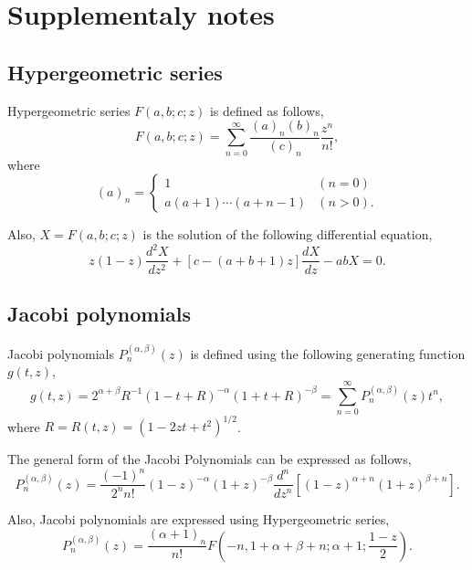 \documentclass[12pt]{article}
\newcommand{\bibun}[2]{\frac{d {#1}}{d {#2}}}
\begin{document}
\section{Supplementaly notes}
\subsection{Hypergeometric series}
Hypergeometric series $F(a,b;c;z)$ is defined as follows,
\begin{equation}
 F(a,b;c;z) = \sum_{n=0}^{\infty} \frac{(a)_n (b)_n}{(c)_n}\frac{z^n}{n!},
\end{equation}
where
\begin{equation}
 (a)_n = \begin{cases}
          1 & (n=0)\\
          a (a+1) \cdots (a+n-1)& (n>0).
         \end{cases}
\end{equation}

Also, $X = F(a,b;c;z)$ is the solution of the following differential equation,
\begin{equation}
 z(1-z)\frac{d^2 X}{d z^2} + \left[ c - (a+b+1)z \right] \bibun{X}{z} - ab X = 0.\label{hypgeo_concrete}
\end{equation}

\subsection{Jacobi polynomials}
Jacobi polynomials $P^{(\alpha,\beta)}_{n} (z)$ is defined using the following generating function $g(t,z)$,
\begin{equation}
 g(t,z) = 2^{\alpha+\beta} R^{-1} (1-t+R)^{-\alpha} (1+t+R)^{-\beta} = \sum_{n=0}^{\infty} P^{(\alpha,\beta)}_{n} (z) t^n,
\end{equation}
where $R = R(t,z) = \left(1 - 2zt + t^2\right)^{1/2}$.

The general form of the Jacobi Polynomials can be expressed as follows,
\begin{equation}
 P^{(\alpha, \beta)}_n (z) = \frac{(-1)^n}{2^n n!} (1-z)^{-\alpha} (1+z)^{-\beta} \frac{d^n}{dz^n}\left[(1-z)^{\alpha+n} (1+z)^{\beta+n}\right].
\end{equation}

Also, Jacobi polynomials are expressed using Hypergeometric series,
\begin{equation}
 P^{(\alpha,\beta)}_{n} (z) = \frac{(\alpha+1)_n}{n!} F \left(-n, 1+\alpha+\beta+n; \alpha+1; \frac{1-z}{2}\right).
\end{equation}
\end{document}
